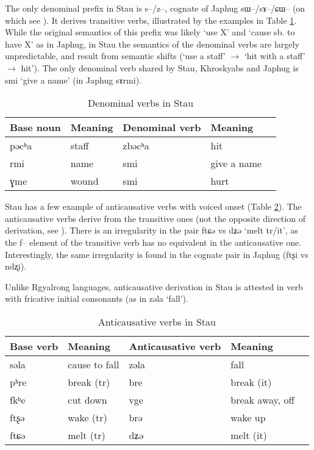 \documentclass[oneside,a4paper,11pt]{article}
\newcommand{\ipa}[1]{{\phon #1}} %
\begin{document}
The only denominal prefix in Stau is \ipa{s--/z--}, cognate of Japhug \ipa{sɯ--/sɤ--/ɕɯ--} (on which see \citealt[14-17]{jacques14antipassive}). It derives transitive verbs, illustrated by the examples in Table \ref{tab:denominal}. While the original semantics of this prefix was likely `use X' and `cause sb. to have X' as in Japhug, in Stau the semantics of the denominal verbs are largely unpredictable, and result from semantic shifts (`use a staff' $\rightarrow$ `hit with a staff' $\rightarrow$  hit'). The only denominal verb shared by Stau, Khroskyabs and Japhug is \ipa{smi} `give a name' (in Japhug \ipa{sɤrmi}).
 
 \begin{table}[H]
 \caption{Denominal verbs in Stau} \label{tab:denominal} \centering 
\begin{tabular}{lllll}
\toprule
Base noun & Meaning & Denominal verb & Meaning \\
\midrule
\ipa{pəcʰa} & staff&\ipa{zbəcʰa} & hit \\
\ipa{rmi} &name &\ipa{smi} &give a name \\
\ipa{ɣme} &wound &\ipa{smi} & hurt \\
\bottomrule
\end{tabular}
\end{table}
 
 
 Stau has a few example of anticausative verbs with voiced onset (Table \ref{tab:anticausative}). The anticausative verbs derive from the transitive ones (not the opposite direction of derivation, see \citealt{jacques12demotion}). There is an irregularity in the pair \ipa{ftɕə} vs \ipa{dʑə} `melt tr/it', as the \ipa{f--} element of the transitive verb has no equivalent in the anticausative one. Interestingly, the same irregularity is found in the cognate pair in Japhug (\ipa{ftʂi} vs \ipa{ndʐi}).
 
Unlike Rgyalrong languages, anticausative derivation in Stau is attested in verb with fricative initial consonants (as in \ipa{zəla}  `fall').
 
  \begin{table}[H]
 \caption{Anticausative verbs in Stau} \label{tab:anticausative} \centering 
\begin{tabular}{lllll}
\toprule
Base verb & Meaning & Anticausative verb & Meaning \\
\midrule
 \ipa{səla} &cause to fall & \ipa{zəla}  & fall \\
\ipa{pʰre}   &break (tr) &\ipa{bre}   & break (it) \\
  \ipa{fkʰe} & cut down & \ipa{vge} & break away, off \\
\ipa{ftʂə}& wake (tr) & \ipa{brə}& wake up\\
\ipa{ftɕə} &melt (tr) &\ipa{dʑə} &melt (it)\\
 \bottomrule
\end{tabular}
\end{table}
 
\end{document}
